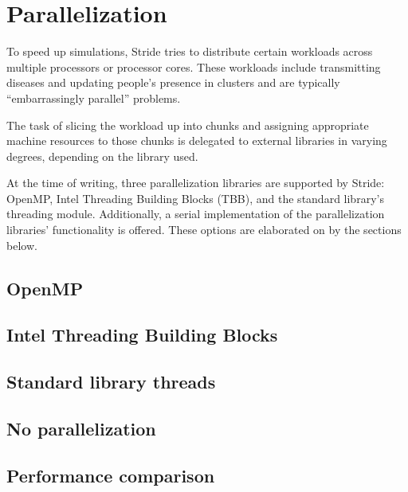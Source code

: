   
\chapter{Parallelization}

To speed up simulations, Stride tries to distribute certain workloads across multiple processors or processor cores. These workloads include transmitting diseases and updating people's presence in clusters and are typically ``embarrassingly parallel'' problems.

The task of slicing the workload up into chunks and assigning appropriate machine resources to those chunks is delegated to external libraries in varying degrees, depending on the library used.

At the time of writing, three parallelization libraries are supported by Stride: OpenMP, Intel Threading Building Blocks (TBB), and the standard library's threading module. Additionally, a serial implementation of the parallelization libraries' functionality is offered. These options are elaborated on by the sections below.

\section{OpenMP}

\section{Intel Threading Building Blocks}

\section{Standard library threads}

\section{No parallelization}

\section{Performance comparison}